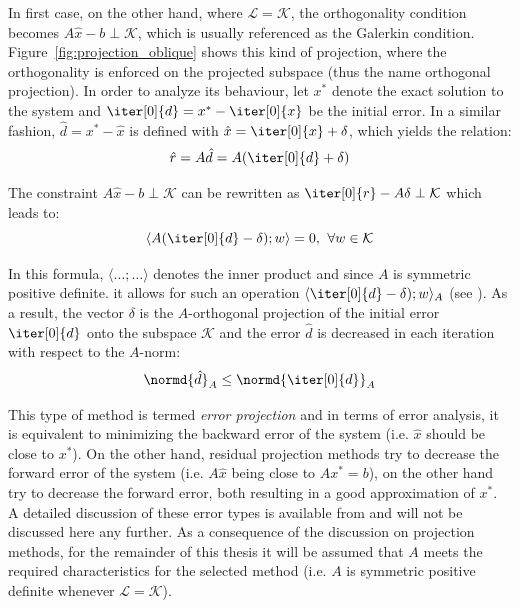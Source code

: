 \noindent In first case, on the other hand, where $\mathcal{L}=\mathcal{K}$, the orthogonality condition becomes $A\hat{x}-b \perp \mathcal{K}$, which is usually referenced as the Galerkin condition. Figure~\hyperref[fig:projection_oblique]{\ref{fig:projection_oblique}} shows this kind of projection, where the orthogonality is enforced on the projected subspace (thus the name orthogonal projection). In order to analyze its behaviour, let $x^*$ denote the exact solution to the system and $\iter[0]{d}=x^*-\iter[0]{x}$ be the initial error. In a similar fashion, $\hat{d} = x^*-\hat{x}$ is defined with $\hat{x}=\iter[0]{x}+\delta$, which yields the relation:
\begin{equation}
    \hat{r} = A\hat{d} = A(\iter[0]{d}+\delta)
\end{equation}

\noindent The constraint $A\hat{x}-b \perp \mathcal{K}$ can be rewritten as $\iter[0]{r}-A\delta \perp \mathcal{K}$ which leads to:
\begin{equation}
    \langle A(\iter[0]{d}-\delta); w\rangle = 0\text{,}\;\; \forall w \in \mathcal{K}
\end{equation}

\noindent In this formula, $\langle\dots;\dots\rangle$ denotes the inner product and since $A$ is symmetric positive definite. it allows for such an operation $\langle \iter[0]{d}-\delta); w\rangle_A$ (see \cite{saad_iterative_2003}). As a result, the vector $\delta$ is the $A$-orthogonal projection of the initial error $\iter[0]{d}$ onto the subspace $\mathcal{K}$ and the error $\hat{d}$ is decreased in each iteration with respect to the $A$-norm:
\begin{equation}
    \normd{\hat{d}}_A \leq \normd{\iter[0]{d}}_A
\end{equation}

\noindent This type of method is termed \textit{error projection} and in terms of error analysis, it is equivalent to minimizing the backward error of the system (i.e. $\hat{x}$ should be close to $x^*$). On the other hand, residual projection methods try to decrease the forward error of the system (i.e. $A\hat{x}$ being close to $Ax^*=b$), on the other hand try to decrease the forward error, both resulting in a good approximation of $x^*$. A detailed discussion of these error types is available from \cite{higham_accuracy_2002} and will not be discussed here any further. As a consequence of the discussion on projection methods, for the remainder of this thesis it will be assumed that $A$ meets the required characteristics for the selected method (i.e. $A$ is symmetric positive definite whenever $\mathcal{L}=\mathcal{K}$).

